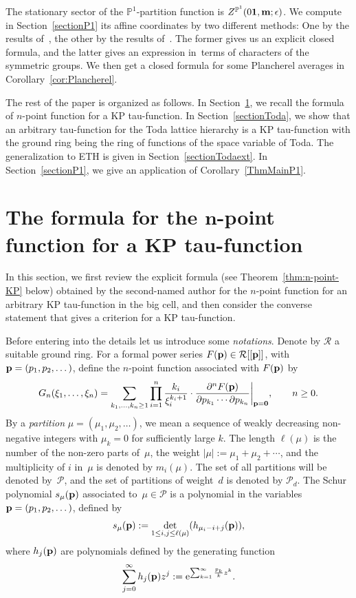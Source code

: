 \documentclass[pdftex]{sigma}
\newcommand{\e}{\epsilon}
\newcommand{\bP}{\mathbb{P}}
\newcommand{\pd}{\partial}
\newcommand{\beq}{\begin{equation}}
\newcommand{\eeq}{\end{equation}}
\numberwithin{equation}{section}
\begin{document}
The stationary sector of the $\bP^1$-partition function is $Z^{\bP^1}(0{\bf 1} ,{\bf m};\e)$.
We compute in Section~\ref{sectionP1} its affine coordinates by two different methods: One by the results of~\cite{DYZ},
the other by the results of~\cite{OP1}.
The former gives us an explicit closed formula,
and the latter gives an expression in~terms of characters of the symmetric groups.
We then get a closed formula for some Plancherel averages in Corollary~\ref{cor:Plancherel}.

The rest of the paper is organized as follows.
In Section~\ref{sectionKP}, we recall the formula of $n$-point function for a KP tau-function.
In Section~\ref{sectionToda}, we show that an arbitrary tau-function for the Toda lattice hierarchy is a KP tau-function with the ground ring
being the ring of functions of the space variable of Toda. The generalization to ETH is given in Section~\ref{sectionTodaext}.
In Section~\ref{sectionP1}, we give an application of Corollary~\ref{ThmMainP1}.

\section[The formula for the n-point function for a KP tau-function]{The formula for the $\boldsymbol{n}$-point function for a KP tau-function}\label{sectionKP}

In this section, we first review the explicit formula (see Theorem~\ref{thm:n-point-KP} below) obtained by the second-named author
for the $n$-point function for an arbitrary KP tau-function in the big cell, and then consider the converse statement that
gives a criterion for a KP tau-function.

Before entering into the details let us introduce some {\it notations}.
Denote by $\mathcal{R}$ a suitable ground ring.
For a formal power series $F({\bf p})\in \mathcal{R}[[{\bf p}]]$,
with ${\bf p}=(p_1,p_2,\dots)$, define the $n$-point function associated with $F({\bf p})$ by
\[
G_n(\xi_1, \dots, \xi_n) = \sum_{k_1,\dots,k_n\ge1} \prod_{i=1}^n \frac{k_i}{\xi_i^{k_i+1}} \cdot
\frac{\pd^n F({\bf p})}{\pd p_{k_1} \cdots \pd p_{k_n}}\biggr|_{{\bf p} = {\bf 0}}, \qquad n\ge0.
\]
By a {\it partition} $\mu=(\mu_1,\mu_2,\dots)$, we mean a sequence of
weakly decreasing non-negative integers with $\mu_k=0$
 for sufficiently large $k$.
 The length $\ell(\mu)$ is the number of the non-zero parts of~$\mu$, the weight $|\mu|:=\mu_1+\mu_2+\cdots$,
 and the multiplicity of $i$ in~$\mu$ is denoted by $m_i(\mu)$.
 The set of all partitions will be denoted by~$\mathcal{P}$, and the set of partitions of weight~$d$ is denoted by $\mathcal{P}_d$.
 The
Schur polynomial $s_{\mu}({\bf p})$ associated to~$\mu\in\mathcal{P}$ is a polynomial in the variables
${\bf p} = (p_1,p_2,\dots)$,
defined by
\beq\label{defSchur1}
s_{\mu}({\bf p}) := \det_{1\leq i,j \leq \ell(\mu)}(h_{\mu_i-i+j}({\bf p})),
\eeq
where $h_j({\bf p})$ are polynomials defined by the generating function
\[
\sum_{j=0}^{\infty}h_j({\bf p})z^j := {\rm e}^{\sum_{k=1}^{\infty} \frac{p_k}{k} z^k}.
\]
\end{document}
